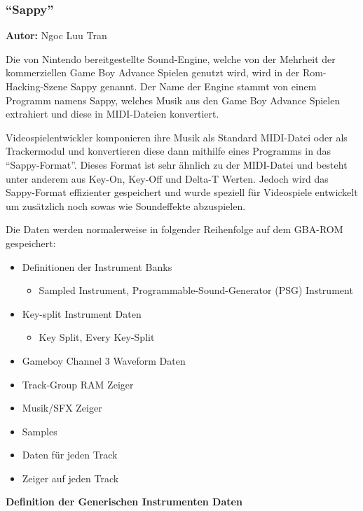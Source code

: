 \documentclass[11pt,a4paper]{scrartcl}
\newcommand{\AutorNgoc} {
    \vspace{-4mm}
    \large \textbf{Autor:} Ngoc Luu Tran \normalsize
    \vspace{2mm}
}
\begin{document}
\subsubsection{\enquote{Sappy}}
\AutorNgoc

Die von Nintendo bereitgestellte Sound-Engine, welche von der Mehrheit der kommerziellen Game Boy Advance Spielen genutzt wird, wird in der Rom-Hacking-Szene Sappy genannt. 
Der Name der Engine stammt von einem Programm namens Sappy, welches Musik aus den Game Boy Advance Spielen extrahiert und diese in MIDI-Dateien konvertiert.


Videospielentwickler komponieren ihre Musik als Standard MIDI-Datei oder als Trackermodul und konvertieren diese dann mithilfe eines Programms in das "`Sappy-Format"'. Dieses Format ist sehr \"{a}hnlich zu der MIDI-Datei und besteht unter anderem aus Key-On, Key-Off und Delta-T Werten. Jedoch wird das Sappy-Format effizienter gespeichert und wurde speziell f\"{u}r Videospiele entwickelt um zus\"{a}tzlich noch sowas wie Soundeffekte abzuspielen.

Die Daten werden normalerweise in folgender Reihenfolge auf dem GBA-ROM gespeichert:
\begin{itemize}
\item Definitionen der Instrument Banks
\begin{itemize}
\item Sampled Instrument, Programmable-Sound-Generator (PSG) Instrument
\end{itemize}
\item Key-split Instrument Daten
\begin{itemize}
\item Key Split, Every Key-Split
\end{itemize}
\item Gameboy Channel 3 Waveform Daten
\item Track-Group RAM Zeiger
\item Musik/SFX Zeiger
\item Samples
\item Daten f\"{u}r jeden Track
\item Zeiger auf jeden Track
\end{itemize}


\newpage

\textbf{{\large Definition der Generischen Instrumenten Daten}}
\end{document}

